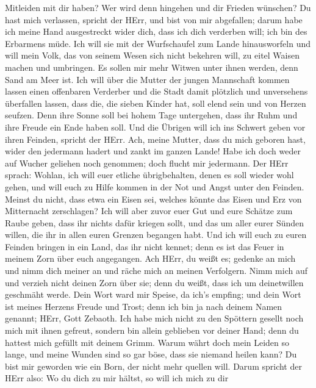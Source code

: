 Mitleiden mit dir haben? Wer wird denn hingehen und dir Frieden
wünschen?  Du hast mich verlassen, spricht der HErr, und
bist von mir abgefallen; darum habe ich meine Hand ausgestreckt wider
dich, dass ich dich verderben will; ich bin des Erbarmens müde.
 Ich will sie mit der Wurfschaufel zum Lande hinausworfeln
und will mein Volk, das von seinem Wesen sich nicht bekehren will, zu
eitel Waisen machen und umbringen.  Es sollen mir mehr
Witwen unter ihnen werden, denn Sand am Meer ist. Ich will über die
Mutter der jungen Mannschaft kommen lassen einen offenbaren Verderber
und die Stadt damit plötzlich und unversehens überfallen lassen,
 dass die, die sieben Kinder hat, soll elend sein und von
Herzen seufzen. Denn ihre Sonne soll bei hohem Tage untergehen, dass ihr
Ruhm und ihre Freude ein Ende haben soll. Und die Übrigen will ich ins
Schwert geben vor ihren Feinden, spricht der HErr.  Ach,
meine Mutter, dass du mich geboren hast, wider den jedermann hadert und
zankt im ganzen Lande! Habe ich doch weder auf Wucher geliehen noch
genommen; doch flucht mir jedermann.  Der HErr sprach:
Wohlan, ich will euer etliche übrigbehalten, denen es soll wieder wohl
gehen, und will euch zu Hilfe kommen in der Not und Angst unter den
Feinden.  Meinst du nicht, dass etwa ein Eisen sei, welches
könnte das Eisen und Erz von Mitternacht zerschlagen?  Ich
will aber zuvor euer Gut und eure Schätze zum Raube geben, dass ihr
nichts dafür kriegen sollt, und das um aller eurer Sünden willen, die
ihr in allen euren Grenzen begangen habt.  Und ich will
euch zu euren Feinden bringen in ein Land, das ihr nicht kennet; denn es
ist das Feuer in meinem Zorn über euch angegangen.  Ach
HErr, du weißt es; gedenke an mich und nimm dich meiner an und räche
mich an meinen Verfolgern. Nimm mich auf und verzieh nicht deinen Zorn
über sie; denn du weißt, dass ich um deinetwillen geschmäht werde.
 Dein Wort ward mir Speise, da ich's empfing; und dein Wort
ist meines Herzens Freude und Trost; denn ich bin ja nach deinem Namen
genannt; HErr, Gott Zebaoth.  Ich habe mich nicht zu den
Spöttern gesellt noch mich mit ihnen gefreut, sondern bin allein
geblieben vor deiner Hand; denn du hattest mich gefüllt mit deinem
Grimm.  Warum währt doch mein Leiden so lange, und meine
Wunden sind so gar böse, dass sie niemand heilen kann? Du bist mir
geworden wie ein Born, der nicht mehr quellen will.  Darum
spricht der HErr also: Wo du dich zu mir hältst, so will ich mich zu dir
